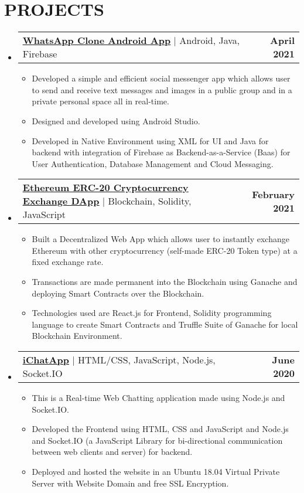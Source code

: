 \documentclass[letterpaper,11pt]{article}
\makeatletter
\newcommand{\resumeItem}[1]{
  \item\small{
    {#1 \vspace{-2pt}}
  }
}
\newcommand{\resumeProjectHeading}[2]{
    \item
    \begin{tabular*}{1.001\textwidth}{l@{\extracolsep{\fill}}r}
      \small#1 & \textbf{\small #2}\\
    \end{tabular*}\vspace{-7pt}
}
\newcommand{\resumeSubHeadingListStart}{\begin{itemize}[leftmargin=0.0in, label={}]}
\newcommand{\resumeSubHeadingListEnd}{\end{itemize}}
\newcommand{\resumeItemListStart}{\begin{itemize}}
\newcommand{\resumeItemListEnd}{\end{itemize}\vspace{-5pt}}
\makeatother
\begin{document}
\section{PROJECTS}
    \vspace{-5pt}
    \resumeSubHeadingListStart
      \resumeProjectHeading
          {\underline{\textbf{\href{https://github.com/SrirajBehera/WhatsApp-Clone-Android-App}{WhatsApp Clone Android App}}} $|$ {Android, Java, Firebase}}{April 2021}
          \resumeItemListStart
            \resumeItem{Developed a simple and efficient social messenger app which allows user to send and receive text messages and images in a public group and in a private personal space all in real-time.}
            \resumeItem{Designed and developed using Android Studio.}
            \resumeItem{Developed in Native Environment using XML for UI and Java for backend with integration of Firebase as Backend-as-a-Service (Baas) for User Authentication, Database Management and Cloud Messaging.}
          \resumeItemListEnd
          \vspace{-13pt}
      \resumeProjectHeading
          {\underline{\textbf{\href{https://github.com/SrirajBehera/Ethereum-ERC-20-CryptoCurrency-Exchange-DApp}{Ethereum ERC-20 Cryptocurrency Exchange DApp}}} $|$ {Blockchain, Solidity, JavaScript}}{February 2021}
          \resumeItemListStart
            \resumeItem{Built a Decentralized Web App which allows user to instantly exchange Ethereum with other cryptocurrency (self-made ERC-20 Token type) at a fixed exchange rate.}
            \resumeItem{Transactions are made permanent into the Blockchain using Ganache and deploying Smart Contracts over the Blockchain.}
            \resumeItem{Technologies used are React.js for Frontend, Solidity programming language to create Smart Contracts and Truffle Suite of Ganache for local Blockchain Environment.}
          \resumeItemListEnd 
          \vspace{-13pt}
          \resumeProjectHeading
          {\underline{\textbf{\href{https://github.com/SrirajBehera/iChatApp}{iChatApp}}} $|$ {HTML/CSS, JavaScript, Node.js, Socket.IO}}{June 2020}
          \resumeItemListStart
            \resumeItem{This is a Real-time Web Chatting application made using Node.js and Socket.IO.}
            \resumeItem{Developed the Frontend using HTML, CSS and JavaScript and Node.js and Socket.IO (a JavaScript Library for bi-directional communication between web clients and server) for backend.}
            \resumeItem{Deployed and hosted the website in an Ubuntu 18.04 Virtual Private Server with Website Domain and free SSL Encryption.}
          \resumeItemListEnd 
    \resumeSubHeadingListEnd
\vspace{-15pt}
\end{document}
